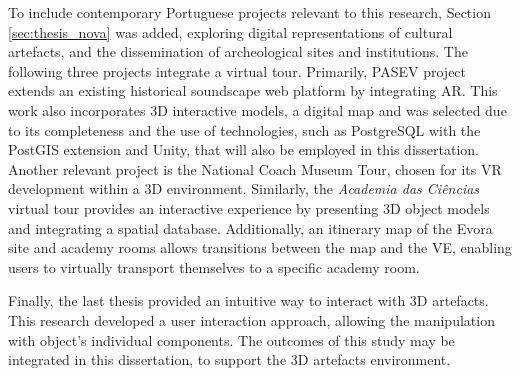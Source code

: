 To include contemporary Portuguese projects relevant to this research, Section \ref{sec:thesis_nova} was added, exploring digital representations of cultural artefacts, and the dissemination of archeological sites and institutions.
The following three projects integrate a virtual tour. Primarily, \gls{PASEV} project extends an existing historical soundscape web platform by integrating \gls{AR}. This work also incorporates 3D interactive models, a digital map and was selected due to its completeness and the use of technologies, such as PostgreSQL with the PostGIS extension and Unity, that will also be employed in this dissertation. 
Another relevant project is the National Coach Museum Tour, chosen for its \gls{VR} development within a 3D environment.
Similarly, the \textit{Academia das Ciências} virtual tour provides an interactive experience by presenting \gls{3D} object models and integrating a spatial database. Additionally, an itinerary map of the Evora site and academy rooms allows transitions between the map and the \gls{VE}, enabling users to virtually transport themselves to a specific academy room.

Finally, the last thesis provided an intuitive way to interact with \gls{3D} artefacts. This research developed a user interaction approach, allowing the manipulation with object's individual components. The outcomes of this study may be integrated in this dissertation, to support the \gls{3D} artefacts environment.


\newcommand{\cmark}{\ding{51}} %
\newcommand{\xmark}{\ding{55}} %

